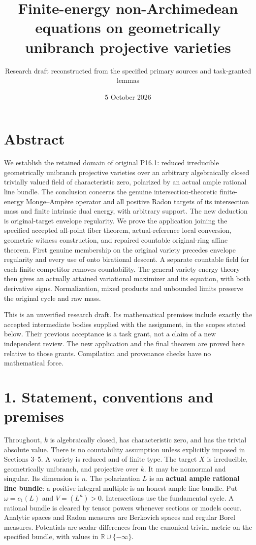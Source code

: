 \documentclass[
  10pt,
]{article}
\title{Finite-energy non-Archimedean equations on geometrically
unibranch projective varieties}
\author{Research draft reconstructed from the specified primary sources
and task-granted lemmas}
\date{5 October 2026}
\begin{document}
\maketitle

\section{Abstract}\label{abstract}

We establish the retained domain of original P16.1: reduced irreducible
geometrically unibranch projective varieties over an arbitrary
algebraically closed trivially valued field of characteristic zero,
polarized by an actual ample rational line bundle. The conclusion
concerns the genuine intersection-theoretic finite-energy Monge--Ampère
operator and all positive Radon targets of its intersection mass and
finite intrinsic dual energy, with arbitrary support. The new deduction
is original-target envelope regularity. We prove the application joining
the specified accepted all-point fiber theorem, actual-reference local
conversion, geometric witness construction, and repaired countable
original-ring affine theorem. First genuine membership on the original
variety precedes envelope regularity and every use of onto birational
descent. A separate countable field for each finite competitor removes
countability. The general-variety energy theory then gives an actually
attained variational maximizer and its equation, with both derivative
signs. Normalization, mixed products and unbounded limits preserve the
original cycle and raw mass.

This is an unverified research draft. Its mathematical premises include
exactly the accepted intermediate bodies supplied with the assignment,
in the scopes stated below. Their previous acceptance is a task grant,
not a claim of a new independent review. The new application and the
final theorem are proved here relative to those grants. Compilation and
provenance checks have no mathematical force.

\section{1. Statement, conventions and
premises}\label{statement-conventions-and-premises}

Throughout, \(k\) is algebraically closed, has characteristic zero, and
has the trivial absolute value. There is no countability assumption
unless explicitly imposed in Sections 3--5. A variety is reduced and of
finite type. The target \(X\) is irreducible, geometrically unibranch,
and projective over \(k\). It may be nonnormal and singular. Its
dimension is \(n\). The polarization \(L\) is an \textbf{actual ample
rational line bundle}: a positive integral multiple is an honest ample
line bundle. Put \(\omega=c_1(L)\) and \(V=(L^n)>0\). Intersections use
the fundamental cycle. A rational bundle is cleared by tensor powers
whenever sections or models occur. Analytic spaces and Radon measures
are Berkovich spaces and regular Borel measures. Potentials are scalar
differences from the canonical trivial metric on the specified bundle,
with values in \(\mathbb R\cup\{-\infty\}\).
\end{document}
